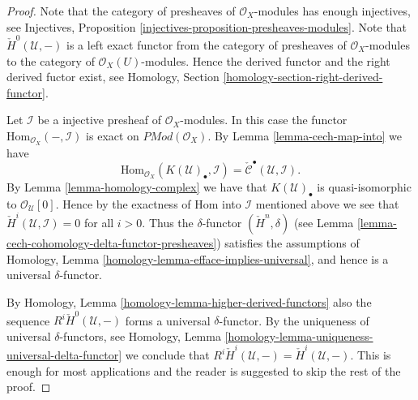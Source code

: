 \begin{proof}
Note that the category of presheaves of $\mathcal{O}_X$-modules
has enough injectives, see
Injectives, Proposition \ref{injectives-proposition-presheaves-modules}.
Note that $\check{H}^0(\mathcal{U}, -)$ is a left exact functor
from the category of presheaves of $\mathcal{O}_X$-modules
to the category of $\mathcal{O}_X(U)$-modules.
Hence the derived functor and the right derived fuctor exist,
see Homology, Section \ref{homology-section-right-derived-functor}.

\medskip\noindent
Let $\mathcal{I}$ be a injective presheaf of $\mathcal{O}_X$-modules.
In this case the functor $\text{Hom}_{\mathcal{O}_X}(-, \mathcal{I})$
is exact on $\textit{PMod}(\mathcal{O}_X)$. By
Lemma \ref{lemma-cech-map-into} we have
$$
\text{Hom}_{\mathcal{O}_X}(K(\mathcal{U})_\bullet, \mathcal{I})
=
\check{\mathcal{C}}^\bullet(\mathcal{U}, \mathcal{I}).
$$
By Lemma \ref{lemma-homology-complex} we have that $K(\mathcal{U})_\bullet$ is
quasi-isomorphic to $\mathcal{O}_{\mathcal{U}}[0]$. Hence by
the exactness of Hom into $\mathcal{I}$ mentioned above we see
that $\check{H}^i(\mathcal{U}, \mathcal{I}) = 0$ for all
$i > 0$. Thus the $\delta$-functor $(\check{H}^n, \delta)$
(see Lemma \ref{lemma-cech-cohomology-delta-functor-presheaves})
satisfies the assumptions of
Homology, Lemma \ref{homology-lemma-efface-implies-universal},
and hence is a universal $\delta$-functor.

\medskip\noindent
By Homology, Lemma \ref{homology-lemma-higher-derived-functors}
also the sequence $R^i\check{H}^0(\mathcal{U}, -)$
forms a universal $\delta$-functor. By the uniqueness of universal
$\delta$-functors, see
Homology, Lemma \ref{homology-lemma-uniqueness-universal-delta-functor}
we conclude that
$R^i\check{H}^i(\mathcal{U}, -) = \check{H}^i(\mathcal{U}, -)$.
This is enough for most applications
and the reader is suggested to skip the rest of the proof.


\end{proof}
